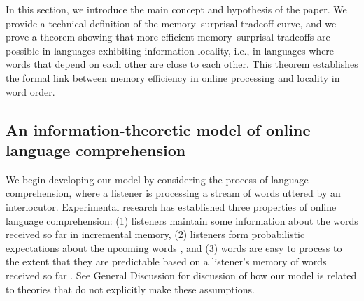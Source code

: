 In this section, we introduce the main concept and hypothesis of the paper. %
We provide a technical definition of the memory--surprisal tradeoff curve, and we prove a theorem showing that more efficient memory--surprisal tradeoffs are possible in languages exhibiting information locality, i.e., in languages where words that depend on each other are close to each other. This theorem establishes the formal link between memory efficiency in online processing and locality in word order.




\subsection{An information-theoretic model of online language comprehension}
\label{sec:listener-tradeoff}

We begin developing our model by considering the process of language comprehension, where a listener is processing a stream of words uttered by an interlocutor.
Experimental research has established three properties of online language comprehension: (1) listeners maintain some information about the words received so far in incremental memory, (2) listeners form probabilistic expectations about the upcoming words \citep[e.g.][]{altmann1999incremental,staub2006syntactic,kuperberg2016we}, and (3) words are easy to process to the extent that they are predictable based on a listener's memory of words received so far \citep{hale2001probabilistic,levy2008expectation,futrell2020lossy}. 
See General Discussion %
for discussion of how our model is related to theories that do not explicitly make these assumptions.

